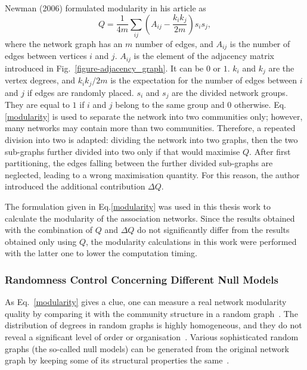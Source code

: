 Newman (2006) formulated modularity in his article as
\begin{equation} %
	Q = \frac {1} {4 m}\sum_ {ij} (A_{ij} - \frac {k_{i} k_{j}}{2 m}) s_{i} s_{j} ,
	\label{modularity}
\end{equation}
where the network graph has an $m$ number of edges, and $A_{ij}$ is the number of edges between vertices $i$ and $j$. $A_{ij}$ is the element of the adjacency matrix introduced in Fig.~\ref{figure-adjacency_graph}. It can be $0$ or $1$. $k_{i}$ and $k_{j}$ are the vertex degrees, and ${k_{i} k_{j}}/{2 m}$ is the expectation for the number of edges between $i$ and $j$ if edges are randomly placed. $s_{i}$ and $s_{j}$ are the divided network groups. They are equal to $1$ if $i$ and $j$ belong to the same group and $0$ otherwise. Eq.\eqref{modularity} is used to separate the network into two communities only; however, many networks may contain more than two communities. Therefore, a repeated division into two is adapted: dividing the network into two graphs, then the two sub-graphs further divided into two only if that would maximise $Q$. After first partitioning, the edges falling between the further divided sub-graphs are neglected, leading to a wrong maximisation quantity. For this reason, the author introduced the additional contribution $\Delta Q$.~\cite{Newman8577}

The formulation given in Eq.\eqref{modularity} was used in this thesis work to calculate the modularity of the association networks. Since the results obtained with the combination of $Q$ and $\Delta Q$ do not significantly differ from the results obtained only using $Q$, the modularity calculations in this work were performed with the latter one to lower the computation timing.

\subsubsection*{Randomness Control Concerning Different Null Models}
As Eq.~\eqref{modularity} gives a clue, one can measure a real network modularity quality by comparing it with the community structure in a random graph~\cite{GirvanNewman2004}. The distribution of degrees in random graphs is highly homogeneous, and they do not reveal a significant level of order or organisation~\cite{FORTUNATO201075}. Various sophisticated random graphs (the so-called null models) can be generated from the original network graph by keeping some of its structural properties the same~\cite{Maslov910, MERTEN2020, FORTUNATO201075, Enders2018}.


